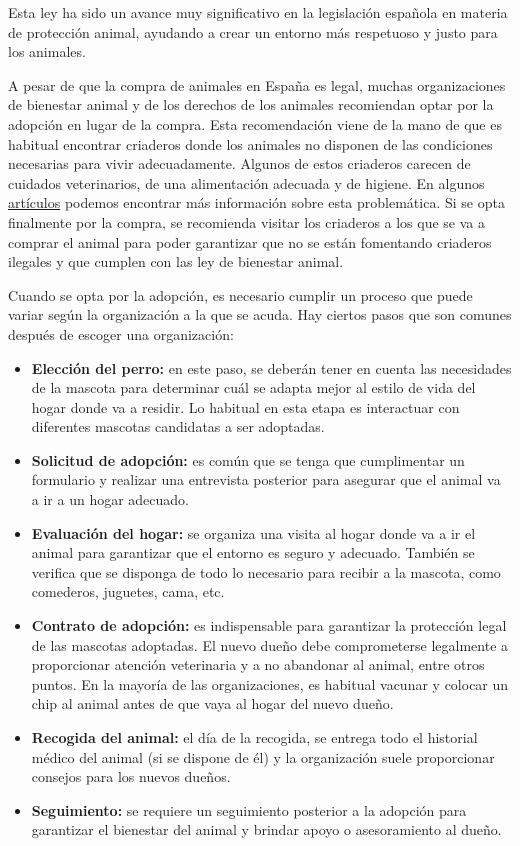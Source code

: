 \documentclass[a4paper, 12pt]{article}
\begin{document}
Esta ley ha sido un avance muy significativo en la legislación española en materia de protección animal, ayudando a crear un entorno más respetuoso y justo para los animales.

A pesar de que la compra de animales en España es legal, muchas organizaciones de bienestar animal y de los derechos de los animales recomiendan optar por la adopción en lugar de la compra. Esta recomendación viene de la mano de que es habitual encontrar criaderos donde los animales no disponen de las condiciones necesarias para vivir adecuadamente. Algunos de estos criaderos carecen de cuidados veterinarios, de una alimentación adecuada y de higiene. En algunos \href{https://investigaciones.petalatino.com/animales-sufren-comercio-mascotas/}{artículos}\cite{petalatino} podemos encontrar más información sobre esta problemática. Si se opta finalmente por la compra, se recomienda visitar los criaderos a los que se va a comprar el animal para poder garantizar que no se están fomentando criaderos ilegales y que cumplen con las ley de bienestar animal.


Cuando se opta por la adopción, es necesario cumplir un proceso que puede variar según la organización a la que se acuda. Hay ciertos pasos que son comunes después de escoger una organización:

\begin{itemize}[noitemsep]
\item \textbf{Elección del perro:} en este paso, se deberán tener en cuenta las necesidades de la mascota para determinar cuál se adapta mejor al estilo de vida del hogar donde va a residir. Lo habitual en esta etapa es interactuar con diferentes mascotas candidatas a ser adoptadas.
\item \textbf{Solicitud de adopción:} es común que se tenga que cumplimentar un formulario y realizar una entrevista posterior para asegurar que el animal va a ir a un hogar adecuado.
\item \textbf{Evaluación del hogar:} se organiza una visita al hogar donde va a ir el animal para garantizar que el entorno es seguro y adecuado. También se verifica que se disponga de todo lo necesario para recibir a la mascota, como comederos, juguetes, cama, etc.
\item \textbf{Contrato de adopción:} es indispensable para garantizar la protección legal de las mascotas adoptadas. El nuevo dueño debe comprometerse legalmente a proporcionar atención veterinaria y a no abandonar al animal, entre otros puntos. En la mayoría de las organizaciones, es habitual vacunar y colocar un chip al animal antes de que vaya al hogar del nuevo dueño.
\item \textbf{Recogida del animal:} el día de la recogida, se entrega todo el historial médico del animal (si se dispone de él) y la organización suele proporcionar consejos para los nuevos dueños.
\item \textbf{Seguimiento:} se requiere un seguimiento posterior a la adopción para garantizar el bienestar del animal y brindar apoyo o asesoramiento al dueño.
\end{itemize}
\end{document}
